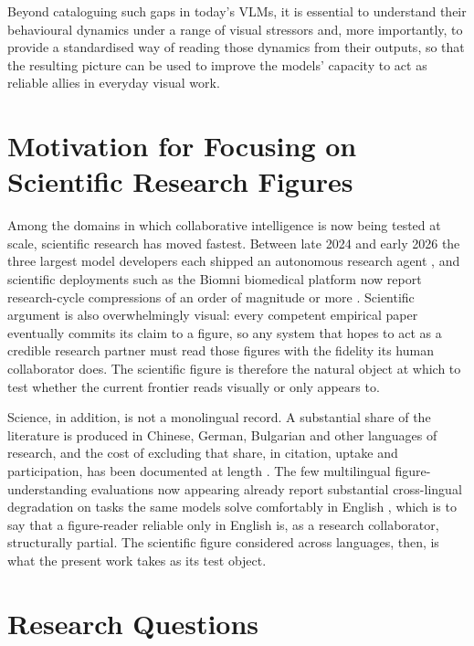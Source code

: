 Beyond cataloguing such gaps in today's VLMs, it is essential to
understand their behavioural dynamics under a range of visual
stressors and, more importantly, to provide a standardised way
of reading those dynamics from their outputs, so that the
resulting picture can be used to improve the models' capacity to
act as reliable allies in everyday visual work.

\FloatBarrier
\section{Motivation for Focusing on Scientific Research Figures}
\label{sec:intro-research}

Among the domains in which collaborative intelligence is now
being tested at scale, scientific research has moved fastest.
Between late 2024 and early 2026 the three largest model
developers each shipped an autonomous research agent
\citep{google2024gemini_deepresearch, openai2025deepresearch,
anthropic2025research}, and scientific deployments such as the
Biomni biomedical platform now report research-cycle
compressions of an order of magnitude or more
\citep{anthropic2026science}. Scientific argument is also
overwhelmingly visual: every competent empirical paper
eventually commits its claim to a figure, so any system that
hopes to act as a credible research partner must read those
figures with the fidelity its human collaborator does. The
scientific figure is therefore the natural object at which to
test whether the current frontier reads visually or only
appears to.

Science, in addition, is not a monolingual record. A
substantial share of the literature is produced in Chinese,
German, Bulgarian and other languages of research, and the
cost of excluding that share, in citation, uptake and
participation, has been documented at length
\citep{amano2023manifold}. The few multilingual figure-
understanding evaluations now appearing already report
substantial cross-lingual degradation on tasks the same models
solve comfortably in English
\citep{li2025polychart, gao2025pm4bench, sharma2025indicvision},
which is to say that a figure-reader reliable only in English
is, as a research collaborator, structurally partial. The
scientific figure considered across languages, then, is what
the present work takes as its test object.

\section{Research Questions}
\label{sec:intro-rqs}

